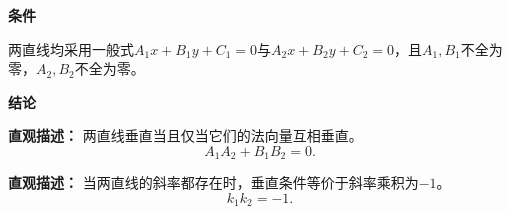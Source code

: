 \begin{statementbox}
	\textbf{\textcolor{CStatement}{条件}}
	\begin{description}[style=nextline, leftmargin=2.8em, labelsep=0.5em, itemsep=0.35em]
		\item[\textbf{\textcolor{CStatement}{条件1（系数不全为零）：}}]
			两直线均采用一般式$A_1x+B_1y+C_1=0$与$A_2x+B_2y+C_2=0$，且$A_1,B_1$不全为零，$A_2,B_2$不全为零。
	\end{description}
	\textbf{\textcolor{CStatement}{结论}}
	\begin{description}[style=nextline, leftmargin=2.8em, labelsep=0.5em, itemsep=0.45em]
		\item[\textbf{\textcolor{CStatement}{结论一（垂直充要条件）：}}]
			\textbf{\textcolor{CStatement}{直观描述：}}
			两直线垂直当且仅当它们的法向量互相垂直。
			\[
				A_1A_2+B_1B_2=0.
			\]
		\item[\textbf{\textcolor{CStatement}{推广结论（斜率乘积形式）：}}]
			\textbf{\textcolor{CStatement}{直观描述：}}
			当两直线的斜率都存在时，垂直条件等价于斜率乘积为$-1$。
			\[
				k_1k_2=-1.
			\]
	\end{description}

\end{statementbox}
